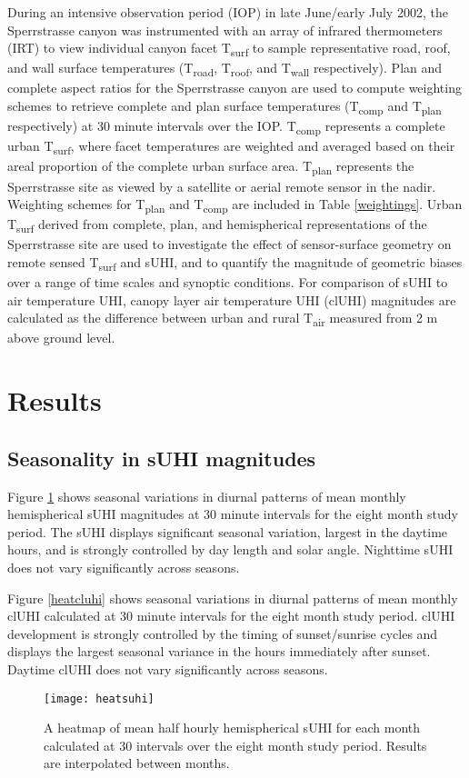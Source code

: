 \begin{bibunit}
During an intensive observation period (IOP) in late June/early July 2002, the Sperrstrasse canyon was instrumented with an array of infrared thermometers (IRT) to view individual canyon facet T\textsubscript{surf} to sample representative road, roof, and wall surface temperatures (T\textsubscript{road}, T\textsubscript{roof}, and T\textsubscript{wall} respectively). Plan and complete aspect ratios for the Sperrstrasse canyon are used to compute weighting schemes to retrieve complete and plan surface temperatures (T\textsubscript{comp} and T\textsubscript{plan} respectively) at 30 minute intervals over the IOP. T\textsubscript{comp} represents a complete urban T\textsubscript{surf}, where facet temperatures are weighted and averaged based on their areal proportion of the complete urban surface area. T\textsubscript{plan} represents the Sperrstrasse site as viewed by a satellite or aerial remote sensor in the nadir. Weighting schemes for T\textsubscript{plan} and T\textsubscript{comp} are included in Table \ref{weightings}. Urban T\textsubscript{surf} derived from complete, plan, and hemispherical representations of the Sperrstrasse site are used to investigate the effect of sensor-surface geometry on remote sensed T\textsubscript{surf} and sUHI, and to quantify the magnitude of geometric biases over a range of time scales and synoptic conditions. For comparison of sUHI to air temperature UHI, canopy layer air temperature UHI (clUHI) magnitudes are calculated as the difference between urban and rural T\textsubscript{air} measured from 2 \si{\meter} above ground level.

\section{Results}

\subsection{Seasonality in sUHI magnitudes}

Figure \ref{heatsuhi} shows seasonal variations in diurnal patterns of mean monthly hemispherical sUHI magnitudes at 30 minute intervals for the eight month study period. The sUHI displays significant seasonal variation, largest in the daytime hours, and is strongly controlled by day length and solar angle. Nighttime sUHI does not vary significantly across seasons. 

Figure \ref{heatcluhi} shows seasonal variations in diurnal patterns of mean monthly clUHI calculated at 30 minute intervals for the eight month study period. clUHI development is strongly controlled by the timing of sunset/sunrise cycles and displays the largest seasonal variance in the hours immediately after sunset. Daytime clUHI does not vary significantly across seasons. 
\begin{figure}[H]
	\centering
	\texttt{[image: heatsuhi]}
	\caption{A heatmap of mean half hourly hemispherical sUHI for each month calculated at 30 \si{\min} intervals over the eight month study period. Results are interpolated between months.}
	\label{heatsuhi}
\end{figure}


\end{bibunit}
